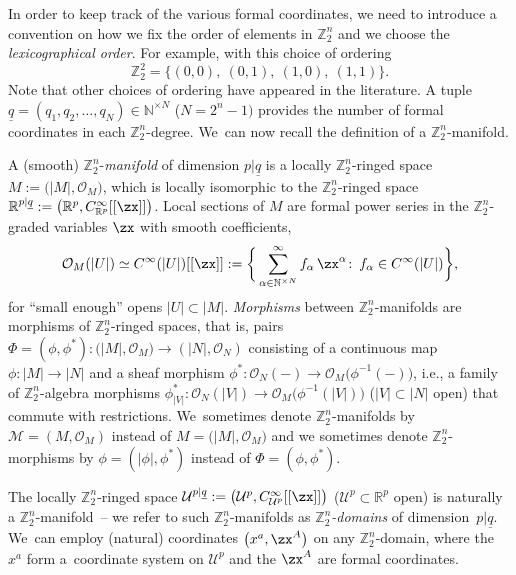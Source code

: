 \documentclass[10pt,a4paper]{amsart}
\newcommand{\R}{{\mathbb R}}
\newcommand{\Z}{{\mathbb Z}}
\def\ul{\underline}
\def\cO{\mathcal{O}}
\def\ul{\underline}
\newcommand{\0}{\otimes}
\newcommand{\z}{\Z_2^n}
\numberwithin{equation}{section}
\begin{document}
In order to keep track of the various formal coordinates, we need to introduce a convention on how we fix the order of elements in $\Z_{2}^{n}$ and we choose the \emph{lexicographical order}. For example, with this choice of ordering
\[
\Z_{2}^{2} = \{ (0,0), \: (0,1), \: (1,0), \: (1,1)\}.
\]
Note that other choices of ordering have appeared in the literature. A tuple $\ul{q} = (q_{1}, q_{2}, \dots , q_{N})\in\mathbb{N}^{\times N}$ ($N = 2^{n}-1)$ provides the number of formal coordinates in each $\z$-degree. We~can now recall the definition of a $\Z_2^n$-manifold.
%
\begin{Definition}\label{def:Z2nMan}
A (smooth) $\Z_{2}^{n}$-\emph{manifold} of dimension $p |\ul{q}$ is a locally $\Z_{2}^{n}$-ringed space $ M := \big(|M|, \cO_M \big)$, which is locally isomorphic to the $\Z_{2}^{n}$-ringed space $\mathbb{R}^{p |\ul{q}} := \big( \mathbb{R}^{p}, C^{\infty}_{\mathbb{R}^{p}}[[\zx]] \big)$. Local sections of $M$ are formal power series in the $\Z_{2}^{n}$-graded variables $\zx$ with smooth coefficients,
\[
\cO_M(|U|) \simeq C^{\infty}(|U|)[[\zx]] := \bigg \{ \sum_{\alpha \in \mathbb{N}^{\times N}}^{\infty} f_{\alpha}\,\zx^{\alpha}\colon \, f_{\alpha} \in C^{\infty}(|U|)\bigg \},
\]
for ``small enough'' opens $|U|\subset |M|$. \emph{Morphisms} between $\Z_{2}^{n}$-manifolds are morphisms of $\Z_{2}^{n}$-ringed spaces, that is, pairs $\Phi = (\phi, \phi^{*}) \colon \big(|M|, \cO_M\big) \rightarrow (|N|, \cO_N)$ consisting of a continuous map $\phi\colon |M| \rightarrow |N|$ and a sheaf morphism $\phi^{*} \colon \cO_N(-) \rightarrow \cO_M\big(\phi^{-1}(-)\big)$, i.e., a family of $\Z_2^n$-algebra morphisms $\phi^*_{|V|}\colon \cO_N(|V|) \rightarrow \cO_M\big(\phi^{-1}(|V|)\big)$ ($|V| \subset |N|$ open) that commute with restrictions. We~sometimes denote $\z$-manifolds by $\mathcal{M}=(M,\cO_M)$ instead of $M = \big(|M|, \cO_M \big)$ and we sometimes denote $\z$-morphisms by $\phi=(|\phi|,\phi^*)$ instead of $\Phi = (\phi, \phi^{*})$. \end{Definition}

\begin{Example}%
The locally $\Z_{2}^{n}$-ringed space $\mathcal{U}^{p|\ul{q}} := \big(\mathcal{U}^p , C^\infty_{\mathcal{U}^p}[[\zx]] \big)$ ($\mathcal{U}^p \subset \R^p$ open) is naturally a $\Z_2^n$-manifold~-- we refer to such $\Z_2^n$-manifolds as \emph{$\Z_2^n$-domains} of dimension~$p|\ul{q}$. We~can employ (natural) coordinates $\big(x^a, \zx^A\big)$ on any $\Z_2^n$-domain, where the $x^a$ form a~coordinate system on $\mathcal{U}^p$ and the $\zx^A$ are formal coordinates.
\end{Example}
\end{document}
